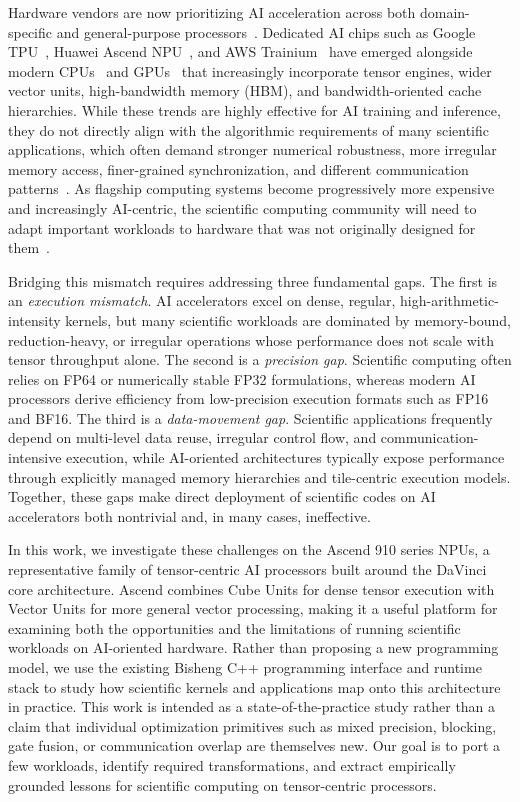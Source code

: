 \documentclass{article}
\newcommand{\rev}[1]{#1}
\begin{document}
Hardware vendors are now prioritizing AI acceleration across both domain-specific and general-purpose processors~\cite{JackNaturePhysics}. Dedicated AI chips such as Google TPU~\cite{9351692}, Huawei Ascend NPU~\cite{Liao2021AscendAS, zuo2025servinglargelanguagemodels}, and AWS Trainium~\cite{10.1145/3698038.3698535} have emerged alongside modern CPUs~\cite{IntelSaphaireRapids} and GPUs~\cite{10070122} that increasingly incorporate tensor engines, wider vector units, high-bandwidth memory (HBM), and bandwidth-oriented cache hierarchies. While these trends are highly effective for AI training and inference, they do not directly align with the algorithmic requirements of many scientific applications, which often demand stronger numerical robustness, more irregular memory access, finer-grained synchronization, and different communication patterns~\cite{JackNaturePhysics}. As flagship computing systems become progressively more expensive and increasingly AI-centric, the scientific computing community will need to adapt important workloads to hardware that was not originally designed for them~\cite{doi:10.1126/science.adu0801}.

Bridging this mismatch requires addressing three fundamental gaps. The first is an \emph{execution mismatch}. AI accelerators excel on dense, regular, high-arithmetic-intensity kernels, but many scientific workloads are dominated by memory-bound, reduction-heavy, or irregular operations whose performance does not scale with tensor throughput alone. The second is a \emph{precision gap}. Scientific computing often relies on FP64 or numerically stable FP32 formulations, whereas modern AI processors derive efficiency from low-precision execution formats such as FP16 and BF16. The third is a \emph{data-movement gap}. Scientific applications frequently depend on multi-level data reuse, irregular control flow, and communication-intensive execution, while AI-oriented architectures typically expose performance through explicitly managed memory hierarchies and tile-centric execution models. Together, these gaps make direct deployment of scientific codes on AI accelerators both nontrivial and, in many cases, ineffective.

In this work, we investigate these challenges on the Ascend 910 series NPUs, a representative family of tensor-centric AI processors built around the DaVinci core architecture. Ascend combines Cube Units for dense tensor execution with Vector Units for more general vector processing, making it a useful platform for examining both the opportunities and the limitations of running scientific workloads on AI-oriented hardware. Rather than proposing a new programming model, we use the existing Bisheng C++ programming interface and runtime stack to study how scientific kernels and applications map onto this architecture in practice. \rev{This work is intended as a state-of-the-practice study rather than a claim that individual optimization primitives such as mixed precision, blocking, gate fusion, or communication overlap are themselves new.} Our goal is to port a few workloads, identify required transformations, and extract empirically grounded lessons for scientific computing on tensor-centric processors.
\end{document}
